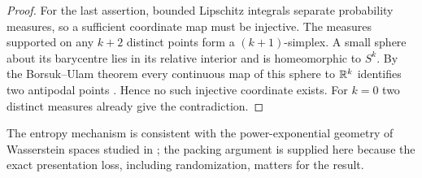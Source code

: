 \begin{proof}
For the last assertion, bounded Lipschitz integrals separate probability
measures, so a sufficient coordinate map must be injective. The measures
supported on any $k+2$ distinct points form a $(k+1)$-simplex. A small
sphere about its barycentre lies in its relative interior and is
homeomorphic to $S^k$. By the Borsuk--Ulam theorem every continuous map
of this sphere to $\mathbb R^k$ identifies two antipodal points
\cite{Matousek2003}. Hence no such injective coordinate exists. For
$k=0$ two distinct measures already give the contradiction.
\end{proof}

The entropy mechanism is consistent with the power-exponential
geometry of Wasserstein spaces studied in \cite{Kloeckner2012}; the
packing argument is supplied here because the exact presentation loss,
including randomization, matters for the result.

